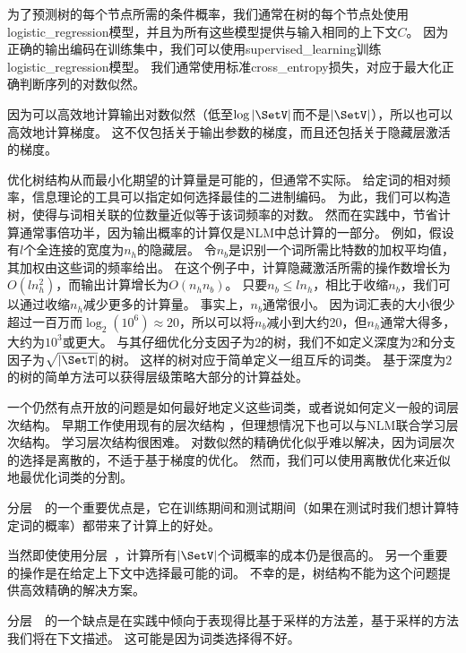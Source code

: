 为了预测树的每个节点所需的条件概率，我们通常在树的每个节点处使用\gls{logistic_regression}模型，并且为所有这些模型提供与输入相同的上下文$C$。
因为正确的输出编码在训练集中，我们可以使用\gls{supervised_learning}训练\gls{logistic_regression}模型。
我们通常使用标准\gls{cross_entropy}损失，对应于最大化正确判断序列的对数似然。

因为可以高效地计算输出对数似然（低至$\log |\SetV|$而不是$ |\SetV|$），所以也可以高效地计算梯度。
这不仅包括关于输出参数的梯度，而且还包括关于隐藏层激活的梯度。

优化树结构从而最小化期望的计算量是可能的，但通常不实际。
给定词的相对频率，信息理论的工具可以指定如何选择最佳的二进制编码。
为此，我们可以构造树，使得与词相关联的位数量近似等于该词频率的对数。
然而在实践中，节省计算通常事倍功半，因为输出概率的计算仅是\gls{NLM}中总计算的一部分。
例如，假设有$l$个全连接的宽度为$n_h$的隐藏层。
令$n_b$是识别一个词所需比特数的加权平均值，其加权由这些词的频率给出。
在这个例子中，计算隐藏激活所需的操作数增长为$O(ln_h^2)$，而输出计算增长为$O(n_h n_b)$。
只要$ n_b \leq l n_h$，相比于收缩$n_b$，我们可以通过收缩$n_h$减少更多的计算量。
事实上，$n_b$通常很小。
因为词汇表的大小很少超过一百万而$\log_ 2(10^6) \approx 20$，所以可以将$n_b$减小到大约20，但$n_h$通常大得多，大约为$10^3$或更大。
与其仔细优化分支因子为$2$的树，我们不如定义深度为2和分支因子为$\sqrt{|\SetT|}$的树。
这样的树对应于简单定义一组互斥的词类。
基于深度为$2$的树的简单方法可以获得层级策略大部分的计算益处。


一个仍然有点开放的问题是如何最好地定义这些词类，或者说如何定义一般的词层次结构。
早期工作使用现有的层次结构\citep{Morin+Bengio-2005-small} ，但理想情况下也可以与\gls{NLM}联合学习层次结构。
学习层次结构很困难。
对数似然的精确优化似乎难以解决，因为词层次的选择是离散的，不适于基于梯度的优化。
然而，我们可以使用离散优化来近似地最优化词类的分割。

分层~~的一个重要优点是，它在训练期间和测试期间（如果在测试时我们想计算特定词的概率）都带来了计算上的好处。

当然即使使用分层~，计算所有$|\SetV|$个词概率的成本仍是很高的。
另一个重要的操作是在给定上下文中选择最可能的词。
不幸的是，树结构不能为这个问题提供高效精确的解决方案。

分层~~的一个缺点是在实践中倾向于表现得比基于采样的方法差，基于采样的方法我们将在下文描述。
这可能是因为词类选择得不好。

